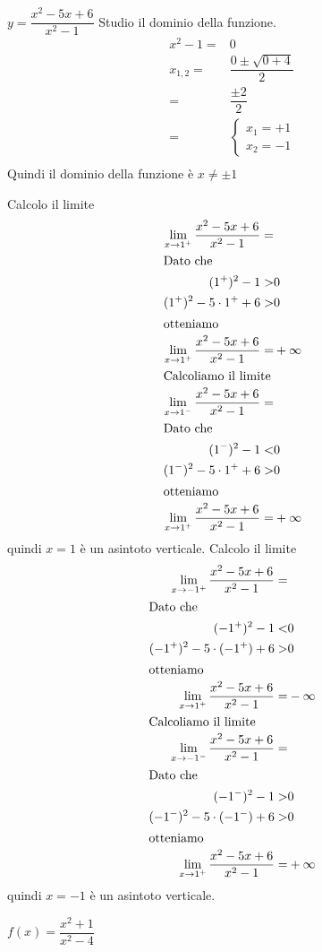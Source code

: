 \begin{exercise}
 $y=\dfrac{x^2-5x+6}{x^2-1}$
	\tcblower
Studio il dominio della funzione. 
\begin{align*}
x^2-1=&0\\ 
x_{1,2}=&\dfrac{0\pm\sqrt{0+4}}{2}\\
=&\dfrac{\pm 2}{2}\\
=&\begin{cases}
x_1=+1\\
x_2=-1
\end{cases}\\
\end{align*}
Quindi il dominio della funzione è  $x\neq\pm1$

Calcolo il limite
\begin{align*}
\lim_{x\to 1^+}\frac{x^2-5x+6}{x^2-1}=&\\
\intertext{Dato che}
(1^+)^2-1>&0\\
(1^+)^2-5\cdot 1^++6>&0\\
\intertext{otteniamo}
\lim_{x\to 1^+}\frac{x^2-5x+6}{x^2-1}=&+\infty\\
\intertext{Calcoliamo il limite}
\lim_{x\to 1^-}\frac{x^2-5x+6}{x^2-1}=&\\
\intertext{Dato che}
(1^-)^2-1<&0\\
(1^-)^2-5\cdot 1^++6>&0\\
\intertext{otteniamo}
\lim_{x\to 1^+}\frac{x^2-5x+6}{x^2-1}=&+\infty\\
\end{align*} 
quindi $x=1$ è un asintoto verticale.
Calcolo il limite
\begin{align*}
\lim_{x\to -1^+}\frac{x^2-5x+6}{x^2-1}=&\\
\intertext{Dato che}
(-1^+)^2-1<&0\\
(-1^+)^2-5\cdot (-1^+)+6>&0\\
\intertext{otteniamo}
\lim_{x\to 1^+}\frac{x^2-5x+6}{x^2-1}=&-\infty\\
\intertext{Calcoliamo il limite}
\lim_{x\to -1^-}\frac{x^2-5x+6}{x^2-1}=&\\
\intertext{Dato che}
(-1^-)^2-1>&0\\
(-1^-)^2-5\cdot (-1^-)+6>&0\\
\intertext{otteniamo}
\lim_{x\to 1^+}\frac{x^2-5x+6}{x^2-1}=&+\infty\\
\end{align*} 
quindi $x=-1$ è un asintoto verticale.
\end{exercise}
\begin{exercise}[no solution]
$f(x)= \dfrac{x^2+1}{x^2-4}$
\end{exercise}
